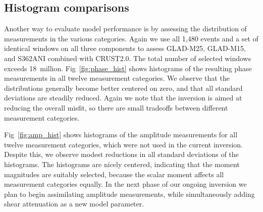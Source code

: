 \documentclass[extra,mreferee]{gji}
\begin{document}
\subsection{Histogram comparisons}
\label{section:Histogram comparisons}

Another way to evaluate model performance is by assessing the distribution
of measurements in the various categories.
Again we use all 1,480 events and a set of identical windows on all three components
to assess GLAD-M25, GLAD-M15, and S362ANI combined with CRUST2.0.
The total number of selected windows exceeds 18~million.
Fig~\ref{fig:phase_hist} shows histograms of the resulting phase
measurements in all twelve measurement categories.
We observe that the distributions generally become better centered on zero,
and that all standard deviations are steadily reduced.
Again we note that the inversion is aimed at reducing the overall misfit,
so there are small tradeoffs between different measurement categories.

Fig~\ref{fig:amp_hist} shows histograms of the amplitude
measurements for all twelve measurement categories,
which were not used in the current inversion.
Despite this,
we observe modest reductions in all standard deviations of the histograms.
The histograms are nicely centered, indicating that the moment magnitudes are suitably selected, because the scalar moment affects all measurement categories equally.
In the next phase of our ongoing inversion we plan to begin assimilating amplitude measurements,
while simultaneously adding shear attenuation as a new model parameter.
\end{document}
